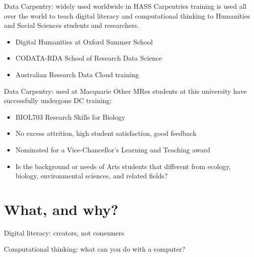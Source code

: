 \documentclass[aspectratio=169, 11pt]{beamer} %
\begin{document}
\begin{frame}{Data Carpentry: widely used worldwide in HASS}
    Carpentries training is used all over the world to teach digital literacy and computational thinking to Humanities and Social Sciences students and researchers.
    \begin{itemize}[label=\textbullet]
        \item Digital Humanities at Oxford Summer School
        \item CODATA-RDA School of Research Data Science
        \item Australian Research Data Cloud training
    \end{itemize}
\end{frame}

\begin{frame}{Data Carpentry: used at Macquarie}
  Other MRes students at this university have successfully undergone DC training:
    \begin{itemize}[label=\textbullet]
        \item BIOL703 Research Skills for Biology
        \item No excess attrition, high student satisfaction, good feedback
        \item Nominated for a Vice-Chancellor's Learning and Teaching award
        \item Is the background or needs of Arts students that different from ecology, biology, environmental sciences, and related fields?
    \end{itemize}
\end{frame}

\section{What, and why?}

\begin{frame}{Digital literacy: creators, not consumers}


\end{frame}

\begin{frame}{Computational thinking: what can you do with a computer?}


\end{frame}
\end{document}
